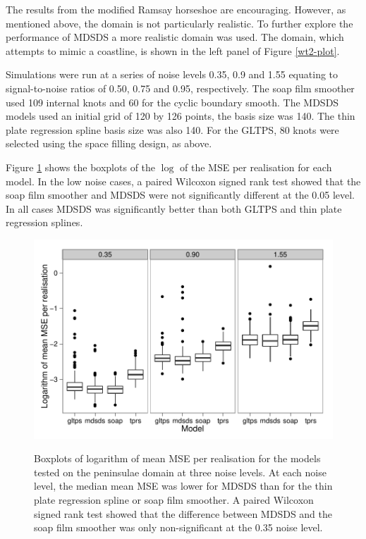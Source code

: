 \documentclass[useAMS, referee]{biom}
\begin{document}
The results from the modified Ramsay horseshoe are encouraging. However, as mentioned above, the domain is not particularly realistic. To further explore the performance of MDSDS a more realistic domain was used. The domain, which attempts to mimic a coastline, is shown in the left panel of Figure \ref{wt2-plot}.

Simulations were run at a series of noise levels 0.35, 0.9 and 1.55 equating to signal-to-noise ratios of 0.50, 0.75 and 0.95, respectively. The soap film smoother used 109 internal knots and 60 for the cyclic boundary smooth. The MDSDS models used an initial grid of 120 by 126 points, the basis size was 140. The thin plate regression spline basis size was also 140. For the GLTPS, 80 knots were selected using the space filling design, as above.

Figure \ref{wt2-boxplots} shows the boxplots of the $\log$ of the MSE per realisation for each model. In the low noise cases, a paired Wilcoxon signed rank test showed that the soap film smoother and MDSDS were not significantly different at the 0.05 level. In all cases MDSDS was significantly better than both GLTPS and thin plate regression splines.


\begin{figure}
\centering
\includegraphics{examples/wt2/wt2-result.pdf} \\
\caption{Boxplots of logarithm of mean MSE per realisation for the models tested on the peninsulae domain at three noise levels. At each noise level, the median mean MSE was lower for MDSDS than for the thin plate regression spline or soap film smoother. A paired Wilcoxon signed rank test showed that the difference between MDSDS and the soap film smoother was only non-significant at the 0.35 noise level.}
\label{wt2-boxplots}
\end{figure}
\end{document}
